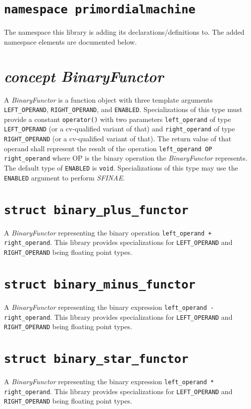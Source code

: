 \documentclass[oneside]{report}
\begin{document}
\section{\texttt{namespace primordialmachine}}
The namespace this library is adding its declarations/definitions to.
The added namespace elements are documented below.

\section{\textit{concept BinaryFunctor}}
A \textit{BinaryFunctor} is a function object with three template arguments \verb+LEFT_OPERAND+,
\verb+RIGHT_OPERAND+, and \verb+ENABLED+. Specializations of this type must provide a
constant \verb+operator()+ with two parameters \verb+left_operand+ of type \verb+LEFT_OPERAND+
(or a cv-qualified variant of that) and \verb+right_operand+ of type \verb+RIGHT_OPERAND+
(or a cv-qualified variant of that). The return value of that operand shall represent the
result of the operation \verb+left_operand OP right_operand+ where OP is the binary operation
the \textit{BinaryFunctor} represents.\\

\noindent{}The default type of \verb+ENABLED+ is \verb+void+. Specializations of this type may use
the \verb+ENABLED+ argument to perform \textit{SFINAE}.

\section{\texttt{struct binary\_plus\_functor}}
A \textit{BinaryFunctor} representing the binary operation \verb|left_operand + right_operand|.
This library provides specializations for \texttt{LEFT\_OPERAND} and \texttt{RIGHT\_OPERAND} being floating point types.

\section{\texttt{struct binary\_minus\_functor}}
A \textit{BinaryFunctor} representing the binary expression \verb|left_operand - right_operand|.
This library provides specializations for \texttt{LEFT\_OPERAND} and \texttt{RIGHT\_OPERAND} being floating point types.

\section{\texttt{struct binary\_star\_functor}}
A \textit{BinaryFunctor} representing the binary expression \verb|left_operand * right_operand|.
This library provides specializations for \texttt{LEFT\_OPERAND} and \texttt{RIGHT\_OPERAND} being floating point types.
\end{document}
